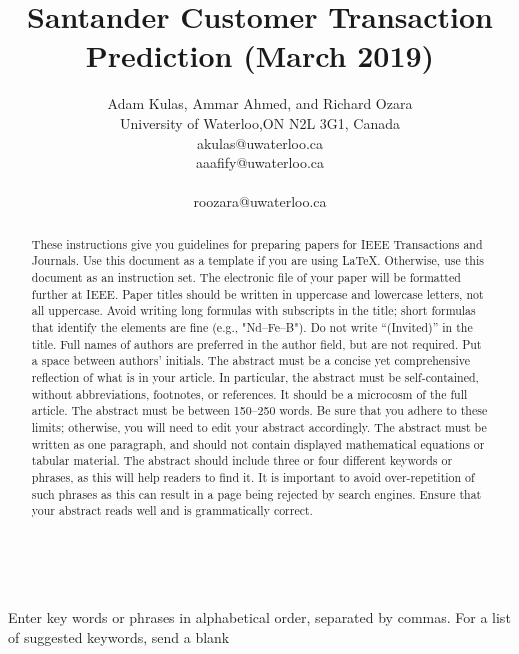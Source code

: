 \documentclass[journal,twoside,web]{ieeecolor}
\begin{document}
\title{Santander Customer Transaction Prediction (March 2019)}\\

\author{Adam Kulas, Ammar Ahmed, and Richard Ozara\\
\institute University of Waterloo,ON N2L 3G1, Canada\\akulas@uwaterloo.ca\\
aaafify@uwaterloo.ca \\\centerline{roozara@uwaterloo.ca}}

\maketitle



\begin{abstract}
These instructions give you guidelines for preparing papers for 
IEEE Transactions and Journals. Use this document as a template if you are 
using \LaTeX. Otherwise, use this document as an 
instruction set. The electronic file of your paper will be formatted further 
at IEEE. Paper titles should be written in uppercase and lowercase letters, 
not all uppercase. Avoid writing long formulas with subscripts in the title; 
short formulas that identify the elements are fine (e.g., "Nd--Fe--B"). Do 
not write ``(Invited)'' in the title. Full names of authors are preferred in 
the author field, but are not required. Put a space between authors' 
initials. The abstract must be a concise yet comprehensive reflection of 
what is in your article. In particular, the abstract must be self-contained, 
without abbreviations, footnotes, or references. It should be a microcosm of 
the full article. The abstract must be between 150--250 words. Be sure that 
you adhere to these limits; otherwise, you will need to edit your abstract 
accordingly. The abstract must be written as one paragraph, and should not 
contain displayed mathematical equations or tabular material. The abstract 
should include three or four different keywords or phrases, as this will 
help readers to find it. It is important to avoid over-repetition of such 
phrases as this can result in a page being rejected by search engines. 
Ensure that your abstract reads well and is grammatically correct.
\end{abstract}

\begin{IEEEkeywords}
Enter key words or phrases in alphabetical 
order, separated by commas. For a list of suggested keywords, send a blank 

\end{IEEEkeywords}
\end{document}
